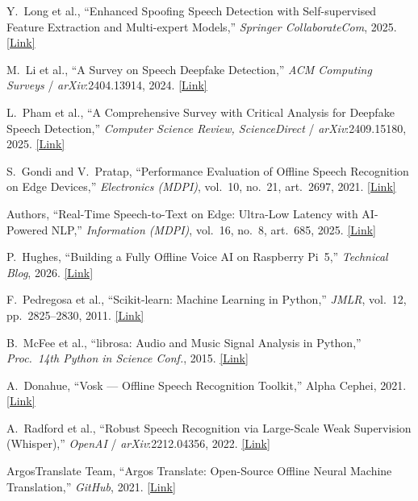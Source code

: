 \documentclass[10pt,twocolumn]{article}
\begin{document}
\noindent
[12] Y.~Long et al., ``Enhanced Spoofing Speech Detection with Self-supervised
Feature Extraction and Multi-expert Models,''
\textit{Springer CollaborateCom}, 2025.
\href{https://link.springer.com/chapter/10.1007/978-3-032-21168-2_7}{[Link]}

\noindent
[13] M.~Li et al., ``A Survey on Speech Deepfake Detection,''
\textit{ACM Computing Surveys} / \textit{arXiv}:2404.13914, 2024.
\href{https://arxiv.org/abs/2404.13914}{[Link]}

\noindent
[14] L.~Pham et al., ``A Comprehensive Survey with Critical Analysis for Deepfake
Speech Detection,'' \textit{Computer Science Review, ScienceDirect} /
\textit{arXiv}:2409.15180, 2025.
\href{https://arxiv.org/abs/2409.15180}{[Link]}

\noindent
[15] S.~Gondi and V.~Pratap, ``Performance Evaluation of Offline Speech Recognition
on Edge Devices,'' \textit{Electronics (MDPI)}, vol.~10, no.~21, art.~2697, 2021.
\href{https://www.mdpi.com/2079-9292/10/21/2697}{[Link]}

\noindent
[16] Authors, ``Real-Time Speech-to-Text on Edge: Ultra-Low Latency with
AI-Powered NLP,'' \textit{Information (MDPI)}, vol.~16, no.~8, art.~685, 2025.
\href{https://www.mdpi.com/2078-2489/16/8/685}{[Link]}

\noindent
[17] P.~Hughes, ``Building a Fully Offline Voice AI on Raspberry Pi~5,''
\textit{Technical Blog}, 2026.
\href{https://bmdpat.com/blog/raspberry-pi-5-local-voice-ai-2026}{[Link]}

\noindent
[18] F.~Pedregosa et al., ``Scikit-learn: Machine Learning in Python,''
\textit{JMLR}, vol.~12, pp.~2825–2830, 2011.
\href{https://jmlr.org/papers/v12/pedregosa11a.html}{[Link]}

\noindent
[19] B.~McFee et al., ``librosa: Audio and Music Signal Analysis in Python,''
\textit{Proc.\ 14th Python in Science Conf.}, 2015.
\href{https://proceedings.scipy.org/articles/Majora-7b98e3ed-003}{[Link]}

\noindent
[20] A.~Donahue, ``Vosk — Offline Speech Recognition Toolkit,''
Alpha Cephei, 2021.
\href{https://alphacephei.com/vosk/}{[Link]}

\noindent
[21] A.~Radford et al., ``Robust Speech Recognition via Large-Scale Weak
Supervision (Whisper),'' \textit{OpenAI} / \textit{arXiv}:2212.04356, 2022.
\href{https://arxiv.org/abs/2212.04356}{[Link]}

\noindent
[22] ArgosTranslate Team, ``Argos Translate: Open-Source Offline Neural Machine
Translation,'' \textit{GitHub}, 2021.
\href{https://github.com/argosopentech/argos-translate}{[Link]}

\endgroup
\end{document}
